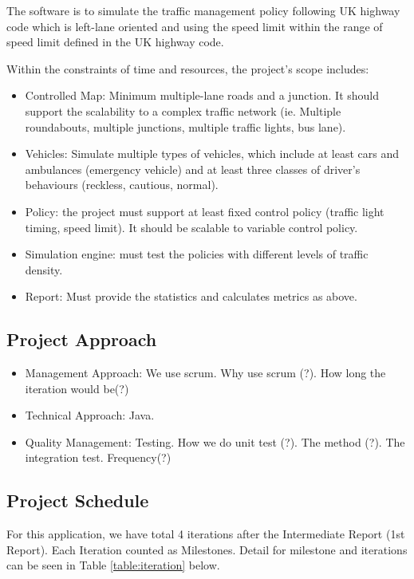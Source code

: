 \documentclass[11pt]{article}
\begin{document}
The software is to simulate the traffic management policy following UK highway code which is left-lane oriented and using the speed limit within the range of speed limit defined in the UK highway code.


Within the constraints of time and resources, the project’s scope includes:
\begin{itemize}
\item Controlled Map: Minimum multiple-lane roads and a junction. It should support the scalability to a complex traffic network (ie. Multiple roundabouts, multiple junctions, multiple traffic lights, bus lane).
\item Vehicles: Simulate multiple types of vehicles, which include at least cars and ambulances (emergency vehicle) and at least three classes of driver’s behaviours (reckless, cautious, normal).
\item Policy: the project must support at least fixed control policy (traffic light timing, speed limit). It should be scalable to variable control policy.
\item Simulation engine: must test the policies with different levels of traffic density.
\item Report: Must provide the statistics and calculates metrics as above.
\end{itemize}


\subsection{Project Approach}
\begin{itemize}
	\item Management Approach: We use scrum. Why use scrum (?). How long the iteration would be(?)
	\item Technical Approach: Java. 
	\item Quality Management: Testing. How we do unit test (?). The method (?). The integration test. Frequency(?)
\end{itemize}
\subsection{Project Schedule}

 For this application, we have total 4 iterations after the Intermediate Report (1st Report). Each Iteration counted as Milestones. Detail for milestone and iterations can be seen in Table \ref{table:iteration} below.
 
\end{document}
